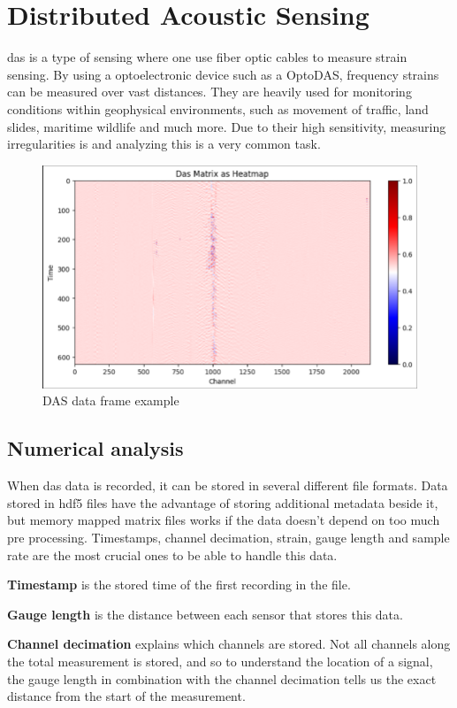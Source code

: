 \section{Distributed Acoustic Sensing}
\label{back:das}

\acrfull{das} is a type of sensing where one use fiber optic cables to measure strain sensing. By using a optoelectronic device such as a OptoDAS, frequency strains can be measured over vast distances. They are heavily used for monitoring conditions within geophysical environments, such as movement of traffic, land slides, maritime wildlife and much more. Due to their high sensitivity, measuring irregularities is and analyzing this is a very common task. 

\begin{figure}[h]
    \centering
    \includegraphics[width=0.7\linewidth]{figures/das_example.png}
    \caption{DAS data frame example}
    \label{fig:dasframe-ex}
\end{figure}

\subsection{Numerical analysis}

When \acrshort{das} data is recorded, it can be stored in several different file formats. Data stored in \acrshort{hdf5} files have the advantage of storing additional metadata beside it, but memory mapped matrix files works if the data doesn't depend on too much pre processing. Timestamps, channel decimation, strain, gauge length and sample rate are the most crucial ones to be able to handle this data. 

\textbf{Timestamp} is the stored time of the first recording in the file.

\textbf{Gauge length} is the distance between each sensor that stores this data.

\textbf{Channel decimation} explains which channels are stored. Not all channels along the total measurement is stored, and so to understand the location of a signal, the gauge length in combination with the channel decimation tells us the exact distance from the start of the measurement.


